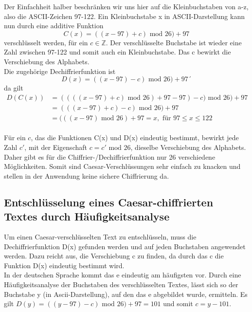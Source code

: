 \documentclass[ngerman,12pt]{article}
\def\mod{\mbox{ mod }}
\begin{document}
Der Einfachheit halber beschränken wir uns hier auf die Kleinbuchstaben von a-z, also die ASCII-Zeichen 97-122.
Ein Kleinbuchstabe x in ASCII-Darstellung kann nun durch eine additive Funktion 
\begin{equation*}
C(x)=((x - 97) + c) \mod 26) +97
\end{equation*}
verschlüsselt werden, für ein $c \in \mathbb{Z}$. Der verschlüsselte Buchstabe ist wieder eine Zahl zwischen 97-122 und somit auch ein Kleinbuchstabe. Das c bewirkt die Verschiebung des Alphabets.\\
Die zugehörige Dechiffrierfunktion ist 
\begin{equation*}
D(x)=((x - 97) - c) \mod 26) +97´
\end{equation*}
da gilt 
\begin{equation*}
\begin{aligned}
D(C(x)) &= ((((x - 97) + c) \mod 26) +97 - 97) - c) \mod 26) +97 \\
		   &= (((x - 97) + c) - c) \mod 26) +97 \\
		   &= (((x - 97)\mod 26) +97 = x, \text{ für } 97 \leq x \leq 122
\end{aligned}
\end{equation*}
\\
Für ein $c$, das die Funktionen C(x) und D(x) eindeutig bestimmt, bewirkt jede Zahl $c'$, mit der Eigenschaft $c = c' \mod 26$, dieselbe Verschiebung des Alphabets. Daher gibt es für die Chiffrier-/Dechiffrierfunktion nur 26 verschiedene Möglichkeiten. Somit sind Caesar-Verschlüssungen sehr einfach zu knacken und stellen in der Anwendung keine sichere Chiffrierung da. \cite{Olligs2003}

\newpage
\subsection*{Entschlüsselung eines Caesar-chiffrierten Textes durch Häufigkeitsanalyse}

Um einen Caesar-verschlüsselten Text zu entschlüsseln, muss die Dechiffrierfunktion D(x) gefunden werden und auf jeden Buchstaben angewendet werden. Dazu reicht aus, die Verschiebung c zu finden, da durch das c die Funktion D(x) eindeutig bestimmt wird. \\
In der deutschen Sprache kommt das e eindeutig am häufigsten vor. Durch eine Häufigkeitsanalyse der Buchstaben des verschlüsselten Textes, lässt sich so der Buchstabe y (in Ascii-Darstellung), auf den das e abgebildet wurde, ermitteln. Es gilt $D(y) = ((y - 97) - c) \mod 26) +97 = 101$ und somit $c = y - 101$.
\end{document}
